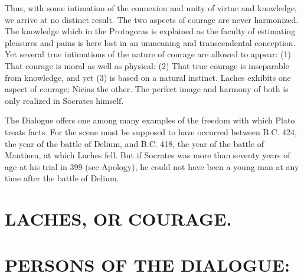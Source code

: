 \documentclass[11pt,letter]{article}
\begin{document}
\par  Thus, with some intimation of the connexion and unity of virtue and knowledge, we arrive at no distinct result. The two aspects of courage are never harmonized. The knowledge which in the Protagoras is explained as the faculty of estimating pleasures and pains is here lost in an unmeaning and transcendental conception. Yet several true intimations of the nature of courage are allowed to appear: (1) That courage is moral as well as physical: (2) That true courage is inseparable from knowledge, and yet (3) is based on a natural instinct. Laches exhibits one aspect of courage; Nicias the other. The perfect image and harmony of both is only realized in Socrates himself.

\par  The Dialogue offers one among many examples of the freedom with which Plato treats facts. For the scene must be supposed to have occurred between B.C. 424, the year of the battle of Delium, and B.C. 418, the year of the battle of Mantinea, at which Laches fell. But if Socrates was more than seventy years of age at his trial in 399 (see Apology), he could not have been a young man at any time after the battle of Delium.

\par 

\par 
\section{
      LACHES,  OR COURAGE.
    }
\par 
\section{
      PERSONS OF THE DIALOGUE:
    } 
\par 

\par 
\end{document}
